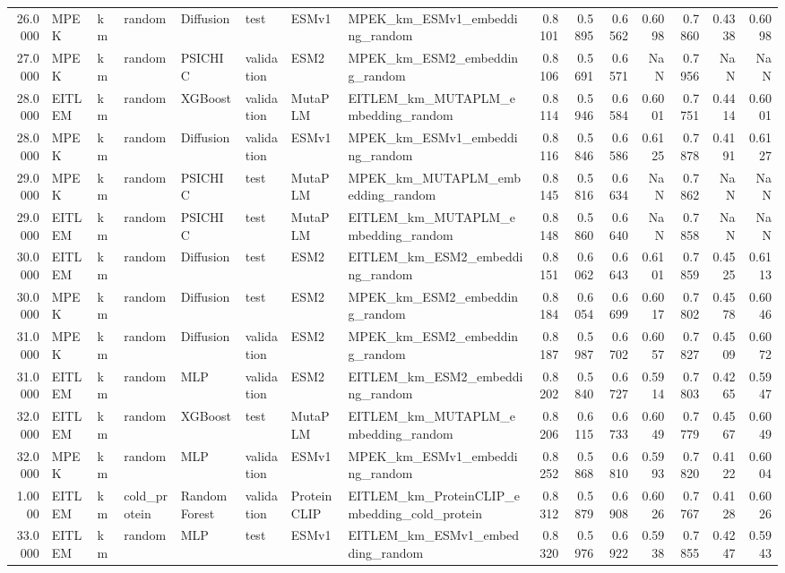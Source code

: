 \begin{tabular}{rlllllllrrrrrrr}
26.0000 & MPEK & km & random & Diffusion & test & ESMv1 & MPEK_km_ESMv1_embedding_random & 0.8101 & 0.5895 & 0.6562 & 0.6098 & 0.7860 & 0.4338 & 0.6098 \\
27.0000 & MPEK & km & random & PSICHIC & validation & ESM2 & MPEK_km_ESM2_embedding_random & 0.8106 & 0.5691 & 0.6571 & NaN & 0.7956 & NaN & NaN \\
28.0000 & EITLEM & km & random & XGBoost & validation & MutaPLM & EITLEM_km_MUTAPLM_embedding_random & 0.8114 & 0.5946 & 0.6584 & 0.6001 & 0.7751 & 0.4414 & 0.6001 \\
28.0000 & MPEK & km & random & Diffusion & validation & ESMv1 & MPEK_km_ESMv1_embedding_random & 0.8116 & 0.5846 & 0.6586 & 0.6125 & 0.7878 & 0.4191 & 0.6127 \\
29.0000 & MPEK & km & random & PSICHIC & test & MutaPLM & MPEK_km_MUTAPLM_embedding_random & 0.8145 & 0.5816 & 0.6634 & NaN & 0.7862 & NaN & NaN \\
29.0000 & EITLEM & km & random & PSICHIC & test & MutaPLM & EITLEM_km_MUTAPLM_embedding_random & 0.8148 & 0.5860 & 0.6640 & NaN & 0.7858 & NaN & NaN \\
30.0000 & EITLEM & km & random & Diffusion & test & ESM2 & EITLEM_km_ESM2_embedding_random & 0.8151 & 0.6062 & 0.6643 & 0.6101 & 0.7859 & 0.4525 & 0.6113 \\
30.0000 & MPEK & km & random & Diffusion & test & ESM2 & MPEK_km_ESM2_embedding_random & 0.8184 & 0.6054 & 0.6699 & 0.6017 & 0.7802 & 0.4578 & 0.6046 \\
31.0000 & MPEK & km & random & Diffusion & validation & ESM2 & MPEK_km_ESM2_embedding_random & 0.8187 & 0.5987 & 0.6702 & 0.6057 & 0.7827 & 0.4509 & 0.6072 \\
31.0000 & EITLEM & km & random & MLP & validation & ESM2 & EITLEM_km_ESM2_embedding_random & 0.8202 & 0.5840 & 0.6727 & 0.5914 & 0.7803 & 0.4265 & 0.5947 \\
32.0000 & EITLEM & km & random & XGBoost & test & MutaPLM & EITLEM_km_MUTAPLM_embedding_random & 0.8206 & 0.6115 & 0.6733 & 0.6049 & 0.7779 & 0.4567 & 0.6049 \\
32.0000 & MPEK & km & random & MLP & validation & ESMv1 & MPEK_km_ESMv1_embedding_random & 0.8252 & 0.5868 & 0.6810 & 0.5993 & 0.7820 & 0.4122 & 0.6004 \\
1.0000 & EITLEM & km & cold_protein & Random Forest & validation & ProteinCLIP & EITLEM_km_ProteinCLIP_embedding_cold_protein & 0.8312 & 0.5879 & 0.6908 & 0.6026 & 0.7767 & 0.4128 & 0.6026 \\
33.0000 & EITLEM & km & random & MLP & test & ESMv1 & EITLEM_km_ESMv1_embedding_random & 0.8320 & 0.5976 & 0.6922 & 0.5938 & 0.7855 & 0.4247 & 0.5943 \\

\end{tabular}
